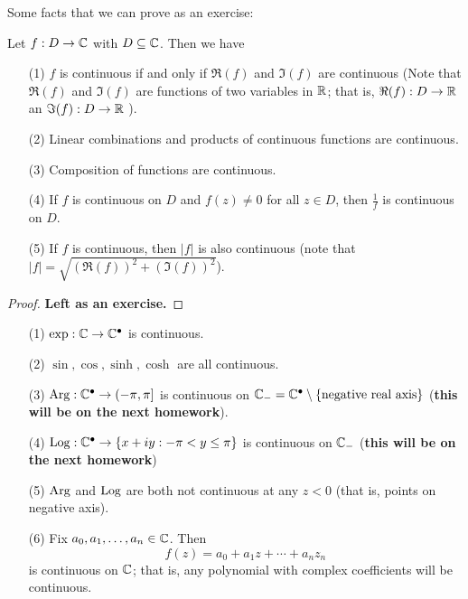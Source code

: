 \documentclass[a4paper]{report}
\begin{document}
Some facts that we can prove as an exercise:

\begin{lemma}
Let \( f: D \to \mathbb{C}  \) with \( D \subseteq \mathbb{C} \). Then we have
\begin{enumerate}
    \item[(1)] \( f  \) is continuous if and only if \( \Re(f) \) and \( \Im(f) \) are continuous (Note that \( \Re(f) \) and \( \Im(f) \) are functions of two variables in \( \mathbb{R}  \); that is, \( \Re(f) : D \to \mathbb{R}  \) an \( \Im(f) : D \to \mathbb{R}  \) ).
    \item[(2)] Linear combinations and products of continuous functions are continuous.
    \item[(3)] Composition of functions are continuous. 
    \item[(4)] If \( f  \) is continuous on \( D  \) and \( f(z) \neq 0  \) for all \( z \in D  \), then \( \frac{ 1 }{ f }  \) is continuous on \( D  \).
    \item[(5)] If \( f  \) is continuous, then \( | f |   \) is also continuous (note that \( | f |  = \sqrt{ (\Re(f))^{2} + (\Im(f))^{2} }  \)).
\end{enumerate}
\end{lemma}
\begin{proof}
\textbf{Left as an exercise.}
\end{proof}

\begin{eg}
    \begin{enumerate}
        \item[(1)] \( \exp: \mathbb{C} \to \mathbb{C}^{\bullet} \) is continuous.
        \item[(2)] \( \sin, \cos, \sinh, \cosh \) are all continuous.
        \item[(3)] \( \operatorname{Arg}: \mathbb{C}^{\bullet} \to (-\pi, \pi] \) is continuous on \( \mathbb{C}_{-} = \mathbb{C}^{\bullet} \setminus  \{ \text{negative real axis} \}  \) (\textbf{this will be on the next homework}).
        \item[(4)] \( \operatorname{Log}: \mathbb{C}^{\bullet} \to \{ x + iy: -\pi < y \leq \pi  \}  \) is continuous on \( \mathbb{C}_{-} \) (\textbf{this will be on the next homework})
        \item[(5)] \( \operatorname{Arg}  \) and \( \operatorname{Log}  \) are both not continuous at any \( z < 0  \) (that is, points on negative axis).
        \item[(6)] Fix \( {a}_{0}, {a}_{1}, \dots, {a}_{n} \in \mathbb{C}  \). Then
            \[  f(z) = {a}_{0} + {a}_{1} z + \cdots + {a}_{n} {z}_{n} \]
            is continuous on \( \mathbb{C}  \); that is, any polynomial with complex coefficients will be continuous.
    \end{enumerate}
\end{eg}
\end{document}

